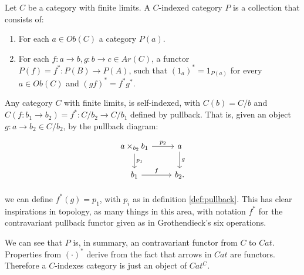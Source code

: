 \begin{definition}
  Let $C$ be a category with finite limits. A $C$-indexed category $P$ is a collection that  consists of:
  \begin{enumerate}
  \item For each $a\in Ob(C)$  a category $P(a)$.
  \item For each $f:a\to b, g:b\to c\in Ar(C)$, a functor $P(f) = f^*:P(B) \to P(A)$, such that $(1_a)^* = 1_{P(a)}$ for every  $a \in Ob(C)$ and $(gf)^*= f^*g^*$.
  \end{enumerate}
\end{definition}
\begin{remark}
  Any category $C$ with finite limits, is self-indexed, with $C(b)=C/b$ and $C(f:b_1\to b_2)=f^*: C/b_2 \to C/b_1$ defined by pullback. That is, given an object $g:a\to b_2 \in C/b_2$, by the pullback diagram:
    \[
      \begin{tikzpicture}
        \node {\begin{tikzcd}
            a \times_{b_2} b_1 \ar[r,"p_2"]\ar[d,"p_1"] & a\ar[d,"g"]\\
            b_1\ar[r,"f"] & b_2.
          \end{tikzcd}};
      \end{tikzpicture}
    \]

    we can define $f^*(g) = p_1$, with $p_i$ as in definition \ref{def:pullback}. This has clear inspirations in topology, as many things in this area, with notation $f^*$ for the contravariant pullback functor given as in Grothendieck's six operations\cite{nlab:six_operations}.\\
  \end{remark}
   
  We can see that $P$ is, in summary, an contravariant functor from $C$ to $Cat$. Properties from $(\cdot)^*$ derive from the fact that arrows in $Cat$ are functors. Therefore a $C$-indexes category is just an object of $Cat^C$.\\

